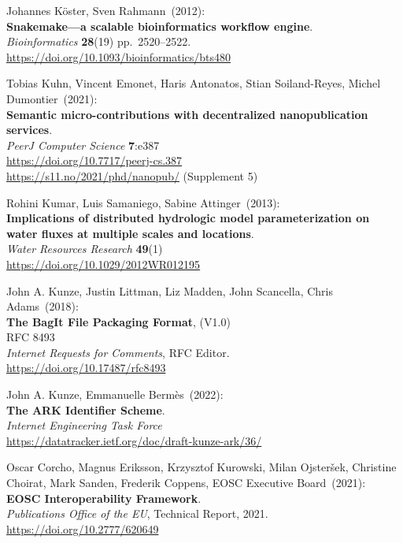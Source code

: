 \begin{thebibliography}{9}
Johannes Köster, Sven Rahmann~(2012): \\
\textbf{Snakemake—a scalable bioinformatics workflow engine}.\\
\emph{Bioinformatics} \textbf{28}(19) pp.~2520--2522.\\
\url{https://doi.org/10.1093/bioinformatics/bts480}

Tobias Kuhn, Vincent Emonet, Haris Antonatos, Stian Soiland-Reyes, Michel Dumontier~(2021): \\
\textbf{Semantic micro-contributions with decentralized nanopublication services}.\\
\emph{PeerJ Computer Science} \textbf{7}:e387\\
\url{https://doi.org/10.7717/peerj-cs.387} \\
\url{https://s11.no/2021/phd/nanopub/} (Supplement 5)

Rohini Kumar, Luis Samaniego, Sabine Attinger~(2013): \\
\textbf{Implications of distributed hydrologic model parameterization on water fluxes at multiple scales and locations}.\\
\emph{Water Resources Research} \textbf{49}(1) \\
\url{https://doi.org/10.1029/2012WR012195}

John A. Kunze, Justin Littman, Liz Madden, John Scancella, Chris Adams~(2018): \\
\textbf{The BagIt File Packaging Format}, (V1.0)\\
RFC 8493\\
\emph{Internet Requests for Comments}, RFC Editor.\\
\url{https://doi.org/10.17487/rfc8493}

John A. Kunze, Emmanuelle Bermès~(2022): \\
\textbf{{The ARK Identifier Scheme}}.\\
\emph{Internet Engineering Task Force}\\
\url{https://datatracker.ietf.org/doc/draft-kunze-ark/36/}

Oscar Corcho, Magnus Eriksson, Krzysztof Kurowski, Milan Ojsteršek, Christine Choirat, Mark Sanden, Frederik Coppens, EOSC Executive Board~(2021): \\
\textbf{EOSC Interoperability Framework}.\\
\emph{Publications Office of the EU}, Technical Report, 2021.\\
\url{https://doi.org/10.2777/620649}


\end{thebibliography}
